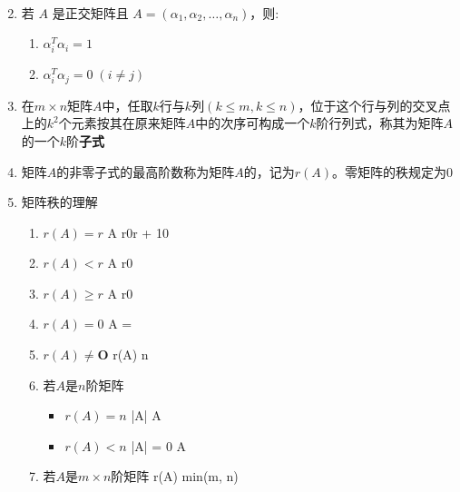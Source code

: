 \documentclass[a4paper,12pt]{article}
\begin{document}
\begin{enumerate}
\begin{align*}
        \end{align*}
        \item 若 $A$ 是正交矩阵且 $A = (\alpha_1,\alpha_2,\dots,\alpha_n)$，则:
        \begin{enumerate}
            \item $\alpha_{i}^{T}\alpha_{i} = 1$
            \item $\alpha_{i}^{T}\alpha_{j} = 0 \; (i \neq j)$
        \end{enumerate}
        \item 在$m \times n$矩阵$A$中，任取$k$行与$k$列$(k \le m, k \le n)$，位于这个行与列的交叉点上的$k^2$个元素按其在原来矩阵$A$中的次序可构成一个$k$阶行列式，称其为矩阵$A$的一个$k$阶\textbf{子式}
        \item 矩阵$A$的非零子式的最高阶数称为矩阵$A$的{\color[rgb]{0.2, 0.6, 0.3}{秩}}，记为$r(A)$。零矩阵的秩规定为$0$
        \item 矩阵秩的理解
        \begin{enumerate}
            \item $r(A) = r$ \Leftrightarrow A r0r + 10
            \item $r(A) < r$ \Leftrightarrow A r0
            \item $r(A) \ge r$ \Leftrightarrow A r0
            \item $r(A) = 0$ \Leftrightarrow A = 
            \item $r(A) \neq \mathbf{O}$  \le r(A) \le n
            \item 若$A$是$n$阶矩阵
            \begin{itemize}
                \item $r(A) = n$ \Leftrightarrow |A|  \Leftrightarrow A
                \item $r(A) < n$ \Leftrightarrow |A| = 0 \Leftrightarrow A
            \end{itemize}
            \item 若$A$是$m \times n$阶矩阵 \Leftrightarrow r(A) \le min(m, n)
        \end{enumerate}
    \end{enumerate}
\end{document}
